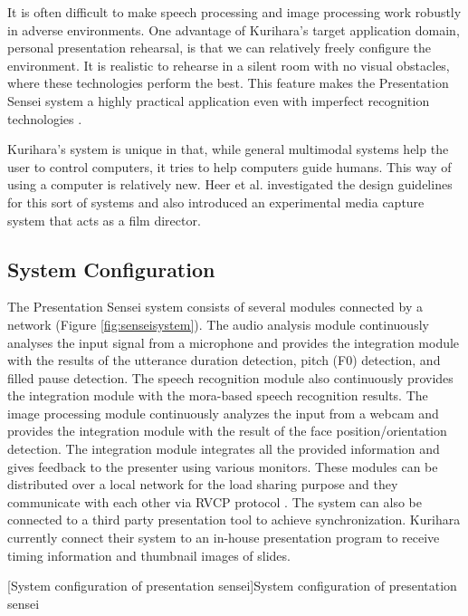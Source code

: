 \par It is often difficult to make speech processing and image processing work robustly in adverse environments. One advantage of Kurihara's target application domain, personal presentation rehearsal, is that we can relatively freely configure the environment. It is realistic to rehearse in a silent room with no visual obstacles, where these technologies perform the best. This feature makes the Presentation Sensei system a highly practical application even with imperfect recognition technologies \cite{Kurihara2007}.
\par Kurihara's system is unique in that, while general multimodal systems help the user to control computers, it tries to help computers guide humans. This way of using a computer is relatively new. Heer et al. \cite{Heer} investigated the design guidelines for this sort of systems and also introduced an experimental media capture system that acts as a film director. 
\subsection*{System Configuration}
\par The Presentation Sensei system consists of several modules connected by a network (Figure \ref{fig:senseisystem}). The audio analysis module continuously analyses the input signal from a microphone and provides the integration module with the results of the utterance duration detection, pitch (F0) detection, and filled pause detection. The speech recognition module also continuously provides the integration module with the mora-based speech recognition results. The image processing module continuously analyzes the input from a webcam and provides the integration module with the result of the face position/orientation detection. The integration module integrates all the provided information and gives feedback to the presenter using various monitors. These modules can be distributed over a local network for the load sharing purpose and they communicate with each other via RVCP protocol \cite{Goto2001}. The system can also be connected to a third party presentation tool to achieve synchronization. Kurihara currently connect their system to an in-house presentation program to receive timing information and thumbnail images of slides.

[System configuration of presentation sensei]{System configuration of presentation sensei \cite{Kurihara2007}}

